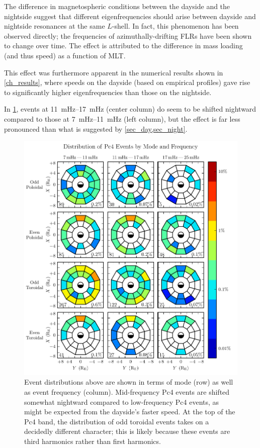 The difference in magnetospheric conditions between the dayside and the
nightside suggest that different eigenfrequencies should arise between dayside
and nightside resonances at the same $L$-shell. In fact, this phenomenon has
been observed directly; the frequencies of azimuthally-drifting FLRs have been
shown to change over time\cite{motoba_2015}. The effect is attributed to the
difference in mass loading (and thus \Alfven speed) as a function of MLT. 

This effect was furthermore apparent in the numerical results shown in
\cref{ch_results}, where \Alfven speeds on the dayside (based on empirical
profiles) gave rise to significantly higher eigenfrequencies than those on the
nightside. 

In \cref{fig_mode_f}, events at \SIrange{11}{17}{\mHz} (center column) do seem
to be shifted nightward compared to those at \SIrange{7}{11}{\mHz} (left
column), but the effect is far less pronounced than what is suggested by
\cref{sec_day,sec_night}. 

\begin{figure}[!htb]
  \centering
  \includegraphics[width=\textwidth]{figures/mode_f.pdf}
  \caption[Rate of Pc4 Events by Mode and Frequency]{
    Event distributions above are shown in terms of mode (row) as well as event
    frequency (column). Mid-frequency Pc4 events are shifted somewhat nightward
    compared to low-frequency Pc4 events, as might be expected from the
    dayside's faster \Alfven speed. At the top of the Pc4 band, the
    distribution of odd toroidal events takes on a decidedly different
    character; this is likely because these events are third harmonics rather
    than first harmonics. 
  }
  \label{fig_mode_f}
\end{figure}

